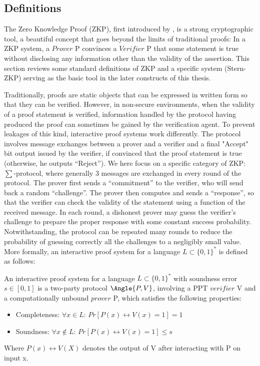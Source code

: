 \subsection{Definitions}
\label{sec:zkpdefinitions}
The Zero Knowledge Proof (ZKP), first introduced by \cite{goldwasser1989knowledge},
is a strong cryptographic tool, a beautiful concept that goes beyond the limits
of traditional proofs: In a ZKP system, a $Prover$ P convinces a $Verifier$ P
that some statement is true without disclosing any information other than the validity of the
assertion. This section reviews some standard definitions of ZKP and a specific
system (Stern-ZKP) serving as the basic tool in the later constructs of
this thesis.

Traditionally, proofs are static objects that can be expressed in written
form so that they can be verified. However, in non-secure environments, when the
validity of a proof statement is verified, information handled by the protocol having produced the proof can sometimes be gained by the verification agent. To prevent leakages of this kind, interactive proof systems work differently. The protocol involves message exchanges between a prover and a verifier and a final "Accept" bit output issued by the verifier, if convinced that the proof statement is true (otherwise, he outputs ``Reject''). We here focus on a specific category of ZKP: \(\sum\)-protocol, where generally 3 messages are exchanged in every round of the protocol. The prover first
sends a ``commitment'' to the verifier, who will send back a random
``challenge''. The prover then computes and sends a ``response'', so that the
verifier can check the validity of the statement using a function of the received
message. In each round, a dishonest prover may guess the verifier's
challenge to prepare the proper response with some constant success
probability. Notwithstanding, the protocol can be repeated many rounds to reduce the
probability of guessing correctly all the challenges to a negligibly small value.  More
formally, an interactive proof system for a language \(L \subset \{0,1\}^{*}\)
is defined as follows:

\begin{definition}
   An interactive proof system for a language
  \(L \subset \{0,1\}^{*}\) with soundness error \(s \in [0,1]\) is a two-party
  protocol \(\Angle{P,V}\), involving a PPT \(verifier \) V and a computationally
  unbound \(prover \) P, which satisfies the following properties:
  \begin{itemize}
  \item Completeness: \(\forall x \in L\): \(Pr[P(x) \leftrightarrow V(x) = 1] = 1\)
  \item Soundness: \(\forall x \notin L\): \(Pr[P(x) \leftrightarrow V(x) = 1] \leq s\)
  \end{itemize}
\end{definition}
Where \(P(x) \leftrightarrow V(X)\) denotes the output of V after interacting
with P on input x.

